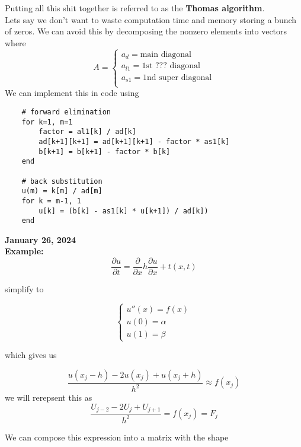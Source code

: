 \documentclass[10pt]{article}
\begin{document}
Putting all this shit together is referred to as the \textbf{Thomas algorithm}.\\

Lets say we don't want to waste computation time and memory storing a bunch of zeros. We can avoid this by decomposing the nonzero elements into vectors where
\[A = 
    \begin{cases}
        a_d = \text{main diagonal}\\
    a_{l1} = \text{1st ??? diagonal}\\
    a_{s1} = \text{1nd super diagonal}\\
    \end{cases}
\]
We can implement this in code using

\begin{verbatim}
    # forward elimination 
    for k=1, m=1
        factor = al1[k] / ad[k]
        ad[k+1][k+1] = ad[k+1][k+1] - factor * as1[k]
        b[k+1] = b[k+1] - factor * b[k]
    end

    # back substitution
    u(m) = k[m] / ad[m]
    for k = m-1, 1
        u[k] = (b[k] - as1[k] * u[k+1]) / ad[k])
    end
\end{verbatim}

\textbf{January 26, 2024}\\

\textbf{Example:} 
\[\frac{\partial u}{\partial t} = \frac{\partial}{\partial x} h \frac{\partial u}{\partial x} + t(x, t)\]

simplify to

\[
    \begin{cases}
        u''(x) = f(x)\\
        u(0) = \alpha\\
        u(1) = \beta
    \end{cases}
\]

which gives us

\[\frac{u(x_j - h) - 2u(x_j) + u(x_j + h)}{h^2} \approx f(x_j)\]
we will rerepsent this as
\[\frac{U_{j-2} - 2U_j + U_{j+1}}{h^2} = f(x_j) = F_j\]

We can compose this expression into a matrix with the shape
\end{document}

